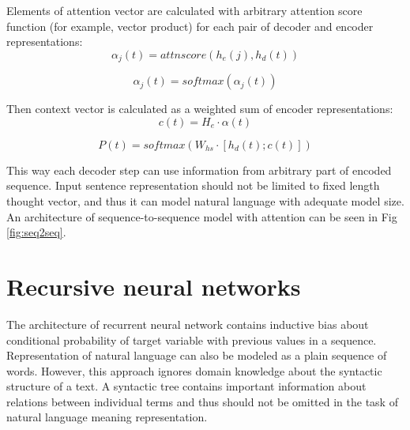 Elements of attention vector are calculated with arbitrary attention score function (for example, vector product) for each pair of decoder and encoder representations:
\begin{equation}
\alpha_j(t) = attnscore(h_e(j), h_d(t))
\label{attn:alpha}
\end{equation}

\begin{equation}
\alpha_j(t) = softmax(\alpha_j(t))
\label{attn:alpha2}
\end{equation}

Then context vector is calculated as a weighted sum of encoder representations:
\begin{equation}
	c(t) = H_e\cdot\alpha(t)
	\label{attn:c}
\end{equation}

\begin{equation}
	P(t) = softmax(W_{hs}\cdot[h_d(t);c(t)])
\label{attn:P}
\end{equation}

This way each decoder step can use information from arbitrary part of encoded sequence. Input sentence representation should not be limited to fixed length thought vector, and thus it can model natural language with adequate model size. An architecture of sequence-to-sequence model with attention can be seen in Fig \ref{fig:seq2seq}.

\section{Recursive neural networks}

The architecture of recurrent neural network contains inductive bias about conditional probability of target variable with previous values in a sequence. Representation of natural language can also be modeled as a plain sequence of words. However, this approach ignores domain knowledge about the syntactic structure of a text. A syntactic tree contains important information about relations between individual terms and thus should not be omitted in the task of natural language meaning representation.

